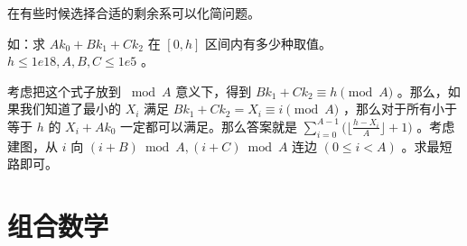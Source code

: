 \documentclass[11pt]{article}
\begin{document}
在有些时候选择合适的剩余系可以化简问题。

如：求 $Ak_0+Bk_1+Ck_2$ 在 $[0,h]$ 区间内有多少种取值。 $h \leq 1e18,A, B, C \leq 1e5$ 。

考虑把这个式子放到 $\bmod A$ 意义下，得到 $Bk_1+Ck_2 \equiv h \pmod A$ 。那么，如果我们知道了最小的 $X_i$ 满足 $Bk_1+Ck_2=X_i \equiv i \pmod A$ ，那么对于所有小于等于 $h$ 的 $X_i+Ak_0$ 一定都可以满足。那么答案就是 $\sum_{i=0}^{A-1} \Big(\Big\lfloor \frac{h-X_i}{A} \Big \rfloor+1\Big)$ 。考虑建图，从 $i$ 向 $(i+B) \bmod A,(i+C) \bmod A$ 连边 $(0\leq i < A)$ 。求最短路即可。

\section{组合数学}
\label{sec-4}
\end{document}
